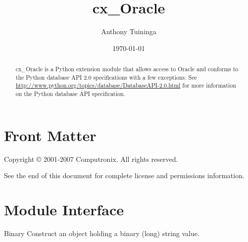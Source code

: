 \documentclass{manual}
\title{cx\_Oracle}
\author{Anthony Tuininga}
\date{\today}                   %
\begin{document}
\maketitle

\ifhtml
\chapter*{Front Matter\label{front}}
\fi

Copyright \copyright{} 2001-2007 Computronix.
All rights reserved.

See the end of this document for complete license and permissions
information.

\begin{abstract}

\noindent
cx_Oracle is a Python extension module that allows access to Oracle and
conforms to the Python database API 2.0 specifications with a few exceptions.
See \url{http://www.python.org/topics/database/DatabaseAPI-2.0.html} for more
information on the Python database API specification.

\end{abstract}

\tableofcontents

\chapter{Module Interface\label{module}}

\begin{funcdesc}{Binary}{}
  Construct an object holding a binary (long) string value.
\end{funcdesc}
\end{document}

